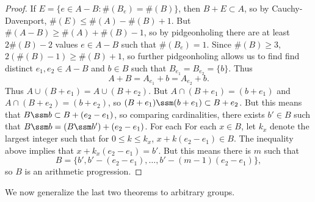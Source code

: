 \begin{proof}
    If $E = \{ e \in A - B: \#(B_e) = \#(B) \}$, then $B + E \subset A$, so by Cauchy-Davenport, $\#(E) \leq \#(A) - \#(B) + 1$. But $\#(A - B) \geq \#(A) + \#(B) - 1$, so by pidgeonholing there are at least $2 \#(B) - 2$ values $e \in A - B$ such that $\#(B_e) = 1$. Since $\#(B) \geq 3$, $2 (\#(B) - 1) \geq \#(B) + 1$, so further pidgeonholing allows us to find find distinct $e_1,e_2 \in A - B$ and $b \in B$ such that $B_{e_1} = B_{e_2} = \{ b \}$. Thus
    \[ A + B = A_{e_1} + b = A_{e_2} + b. \]
    Thus $A \cup (B + e_1) = A \cup (B + e_2)$. But $A \cap (B + e_1) = (b + e_1)$ and $A \cap (B + e_2) = (b + e_2)$, so $(B + e_1) \ssm (b + e_1) \subset B + e_2$. But this means that $B \ssm b \subset B + (e_2 - e_1)$, so comparing cardinalities, there exists $b' \in B$ such that $B \ssm b = (B \ssm b') + (e_2 - e_1)$. For each For each $x \in B$, let $k_x$ denote the largest integer such that for $0 \leq k \leq k_x$, $x + k(e_2 - e_1) \in B$. The inequality above implies that $x + k_x(e_2 - e_1) = b'$. But this means there is $m$ such that
    \[ B = \{ b', b' - (e_2 - e_1), \dots, b' - (m-1)(e_2 - e_1) \}, \]
    so $B$ is an arithmetic progression.
\end{proof}

We now generalize the last two theorems to arbitrary groups.

